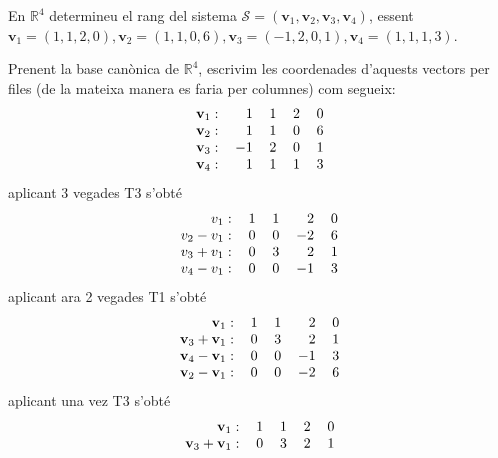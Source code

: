 \begin{exemple}
En $\mathbb{R}^{4}$ determineu el rang del sistema $\mathcal{S}=(\mathbf{v}%
_{1},\mathbf{v}_{2},\mathbf{v}_{3},\mathbf{v}_{4})$, essent $\mathbf{v}%
_{1}=(1,1,2,0),\mathbf{v}_{2}=(1,1,0,6),\mathbf{v}_{3}=(-1,2,0,1),\mathbf{v}%
_{4}=(1,1,1,3)$.

\end{exemple}
\begin{solucio}
Prenent la base canònica de $\mathbb{R}^{4}$, escrivim les coordenades
d’aquests vectors per files (de la mateixa manera es faria per columnes) com
segueix:%
\begin{equation*}
\begin{tabular}{rrrrr}
$\mathbf{v}_{1}:$ & $1$ & $1$ & $2$ & $0$ \\ 
$\mathbf{v}_{2}:$ & $1$ & $1$ & $0$ & $6$ \\ 
$\mathbf{v}_{3}:$ & $-1$ & $2$ & $0$ & $1$ \\ 
$\mathbf{v}_{4}:$ & $1$ & $1$ & $1$ & $3$%
\end{tabular}%
\end{equation*}%
aplicant 3 vegades T3 s’obté%
\begin{equation*}
\begin{tabular}{rrrrr}
$v_{1}:$ & $1$ & $1$ & $2$ & $0$ \\ 
$v_{2}-v_{1}:$ & $0$ & $0$ & $-2$ & $6$ \\ 
$v_{3}+v_{1}:$ & $0$ & $3$ & $2$ & $1$ \\ 
$v_{4}-v_{1}:$ & $0$ & $0$ & $-1$ & $3$%
\end{tabular}%
\end{equation*}%
aplicant ara 2 vegades T1 s’obté%
\begin{equation*}
\begin{tabular}{rrrrr}
$\mathbf{v}_{1}:$ & $1$ & $1$ & $2$ & $0$ \\ 
$\mathbf{v}_{3}+\mathbf{v}_{1}:$ & $0$ & $3$ & $2$ & $1$ \\ 
$\mathbf{v}_{4}-\mathbf{v}_{1}:$ & $0$ & $0$ & $-1$ & $3$ \\ 
$\mathbf{v}_{2}-\mathbf{v}_{1}:$ & $0$ & $0$ & $-2$ & $6$%
\end{tabular}%
\end{equation*}%
aplicant una vez T3 s’obté%
\begin{equation*}
\begin{tabular}{rrrrr}
$\mathbf{v}_{1}:$ & $1$ & $1$ & $2$ & $0$ \\ 
$\mathbf{v}_{3}+\mathbf{v}_{1}:$ & $0$ & $3$ & $2$ & $1$ \\ 

\end{tabular}
\end{equation*}
\end{solucio}
